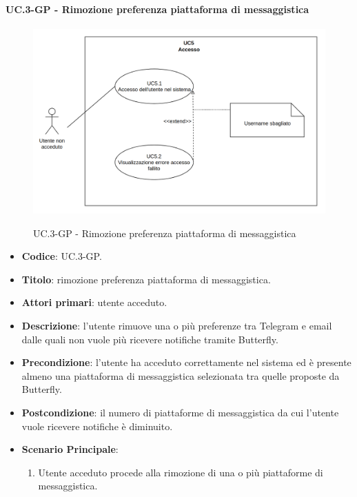 		\paragraph{UC\theuccount.3-GP - Rimozione preferenza piattaforma di messaggistica}
		\begin{figure}[H]
			\centering
			\includegraphics[width=\columnwidth]{img/UC5.png}\\
			\caption{UC\theuccount.3-GP - Rimozione preferenza piattaforma di messaggistica}
		\end{figure}
		\begin{itemize}
			\item \textbf{Codice}: UC\theuccount.3-GP.
			\item \textbf{Titolo}: rimozione preferenza piattaforma di messaggistica.
			\item \textbf{Attori primari}: utente acceduto.
			\item \textbf{Descrizione}: l’utente rimuove una o più preferenze tra Telegram e email dalle
			quali non vuole più ricevere notifiche tramite Butterfly.
			\item \textbf{Precondizione}: l’utente ha acceduto correttamente nel sistema ed è presente
			almeno una piattaforma di messaggistica selezionata tra quelle proposte da Butterfly.
			\item \textbf{Postcondizione}: il numero di piattaforme di messaggistica da cui l’utente vuole ricevere notifiche è diminuito.
			\item \textbf{Scenario Principale}:
			\begin{enumerate}
				\item Utente acceduto procede alla rimozione di una o più piattaforme di messaggistica.
			\end{enumerate}
		\end{itemize}
		
